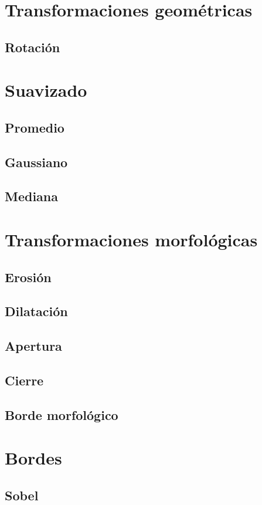 \section{Transformaciones geométricas}
\subsection{Rotación}

\section{Suavizado}
\subsection{Promedio}
\subsection{Gaussiano}
\subsection{Mediana}

\section{Transformaciones morfológicas}
\subsection{Erosión}
\subsection{Dilatación}
\subsection{Apertura}
\subsection{Cierre}
\subsection{Borde morfológico}

\section{Bordes}
\subsection{Sobel}

